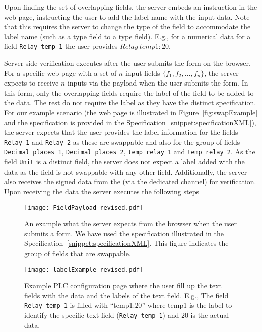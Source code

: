 Upon finding the set of overlapping fields, the server embeds an instruction in the web page, instructing the user to add the label name with the input data. Note that this requires the server to change the type of the field to accommodate the label name (such as a \Date type field to a \String type field). E.g., for a numerical data for a field \texttt{Relay temp 1} the user provides $Relay\ temp1: 20$.

 Server-side verification executes after the user submits the form on the browser. For a specific web page with a set of $n$ input fields $\{f_1, f_2, \ldots, f_n\}$, the server expects to receive $n$ inputs via the \https payload when the user submits the form. In this form, only the overlapping fields require the label of the field to be added to the data. The rest do not require the label as they have the distinct specification. For our example scenario (the web page is illustrated in Figure~\ref{fig:swapExample} and the specification is provided in the Specification~\ref{snippet:specificationXML}), the server expects that the user provides the label information for the fields \texttt{Relay 1} and \texttt{Relay 2} as these are swappable and also for the group of fields \texttt{Decimal places 1}, \texttt{Decimal places 2}, \texttt{temp relay 1} and  \texttt{temp relay 2}. As the field \texttt{Unit} is a distinct field, the server does not expect a label added with the data as the field is not swappable with any other field. Additionally, the server also receives the signed data from the \device (via the dedicated \tls channel) for verification. Upon receiving the data the server executes the following steps

\begin{figure}[t]
 \centering
 \texttt{[image: FieldPayload\_revised.pdf]}
 \caption{An example what the server expects from the browser when the user submits a form. We have used the specification illustrated in the Specification~\ref{snippet:specificationXML}. This figure indicates the group of fields that are swappable.}
 \label{fig:payload}
\end{figure}

\begin{figure}[t]
 \centering
 \texttt{[image: labelExample\_revised.pdf]}
 \caption{Example PLC configuration page where the user fill up the text fields with the data and the labels of the text field. E.g., The field \texttt{Relay temp 1} is filled with ``temp1:$20$'' where temp1 is the label to identify the specific text field (\texttt{Relay temp 1}) and $20$ is the actual data.} 
 \label{fig:labelEx}
\end{figure}

